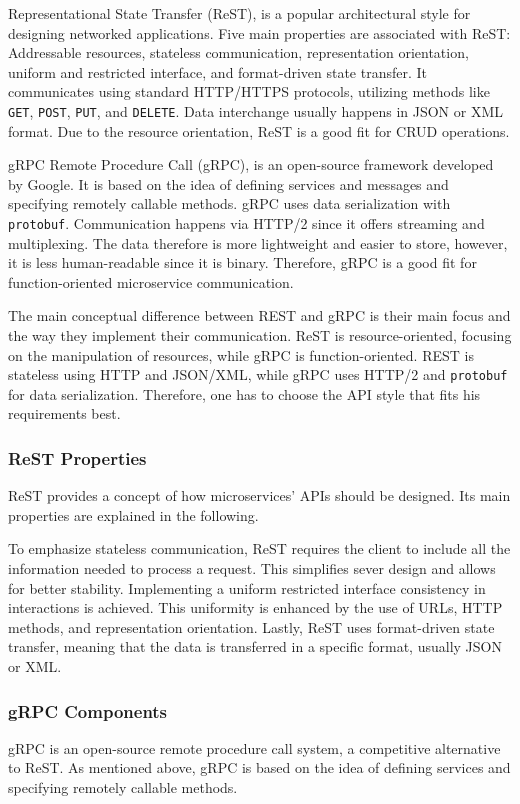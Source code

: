 Representational State Transfer (ReST), is a popular architectural style for designing networked applications.
Five main properties are associated with ReST: Addressable resources, stateless communication, representation orientation, uniform and restricted interface, and format-driven state transfer.
It communicates using standard HTTP/HTTPS protocols, utilizing methods like \texttt{GET}, \texttt{POST}, \texttt{PUT}, and \texttt{DELETE}. 
Data interchange usually happens in JSON or XML format.
Due to the resource orientation, ReST is a good fit for CRUD operations.

gRPC Remote Procedure Call (gRPC), is an open-source framework developed by Google.
It is based on the idea of defining services and messages and specifying remotely callable methods.
gRPC uses data serialization with \texttt{protobuf}.
Communication happens via HTTP/2 since it offers streaming and multiplexing.
The data therefore is more lightweight and easier to store, however, it is less human-readable since it is binary.
Therefore, gRPC is a good fit for function-oriented microservice communication.

The main conceptual difference between REST and gRPC is their main focus and the way they implement their communication.
ReST is resource-oriented, focusing on the manipulation of resources, while gRPC is function-oriented.
REST is stateless using HTTP and JSON/XML, while gRPC uses HTTP/2 and \texttt{protobuf} for data serialization.
Therefore, one has to choose the API style that fits his requirements best.

\subsubsection*{ReST Properties}
ReST provides a concept of how microservices' APIs should be designed.
Its main properties are explained in the following.

To emphasize stateless communication, ReST requires the client to include all the information needed to process a request.
This simplifies sever design and allows for better stability.
Implementing a uniform restricted interface consistency in interactions is achieved.
This uniformity is enhanced by the use of URLs, HTTP methods, and representation orientation.
Lastly, ReST uses format-driven state transfer, meaning that the data is transferred in a specific format, usually JSON or XML.

\subsubsection*{gRPC Components}
gRPC is an open-source remote procedure call system, a competitive alternative to ReST.
As mentioned above, gRPC is based on the idea of defining services and specifying remotely callable methods.

